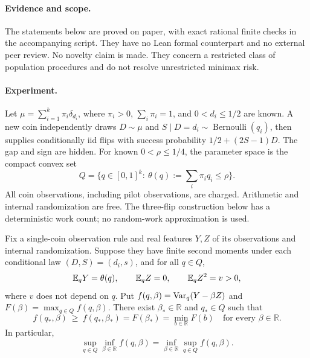 


\paragraph{Evidence and scope.}
The statements below are proved on paper, with exact rational finite checks
in the accompanying script. They have no Lean formal counterpart and no
external peer review. No novelty claim is made. They concern a restricted
class of population procedures and do not resolve unrestricted minimax risk.

\paragraph{Experiment.}
Let $\mu=\sum_{i=1}^k\pi_i\delta_{d_i}$, where $\pi_i>0$,
$\sum_i\pi_i=1$, and $0<d_i\le1/2$ are known. A new coin independently draws
$D\sim\mu$ and $S\mid D=d_i\sim\operatorname{Bernoulli}(q_i)$, then supplies
conditionally iid flips with success probability $1/2+(2S-1)D$.
The gap and sign are hidden. For known $0<\rho\le1/4$, the parameter space is
the compact convex set
\[
 Q=\{q\in[0,1]^k:\ \theta(q):=\textstyle\sum_i\pi_iq_i\le\rho\}.
\]
All coin observations, including pilot observations, are charged. Arithmetic
and internal randomization are free. The three-flip construction below has a
deterministic work count; no random-work approximation is used.

\begin{theorem}\label{thm:saddle}
Fix a single-coin observation rule and real features $Y,Z$ of its observations
and internal randomization. Suppose they have finite second moments under
each conditional law $(D,S)=(d_i,s)$, and for all $q\in Q$,
\[
 \mathbb E_qY=\theta(q),\qquad \mathbb E_qZ=0,\qquad \mathbb E_qZ^2=v>0,
\]
where $v$ does not depend on $q$. Put
$f(q,\beta)=\operatorname{Var}_q(Y-\beta Z)$ and
$F(\beta)=\max_{q\in Q}f(q,\beta)$.
There exist $\beta_*\in\mathbb R$ and $q_*\in Q$ such that
\[
 f(q_*,\beta)\ \ge\ f(q_*,\beta_*)=F(\beta_*)=\min_{b\in\mathbb R}F(b)
 \quad\text{for every }\beta\in\mathbb R.
\]
In particular,
\[
 \sup_{q\in Q}\inf_{\beta\in\mathbb R} f(q,\beta)
 =\inf_{\beta\in\mathbb R}\sup_{q\in Q} f(q,\beta).
\]
\end{theorem}

